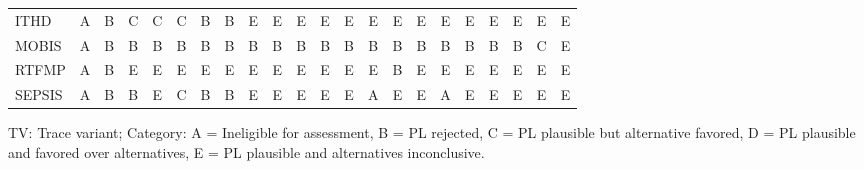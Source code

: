 {\begin{tabular}{lccccccccccccccccccccc}
ITHD & \cellcolor[HTML]{FFFFFF} A & \cellcolor[HTML]{EA4646} B & \cellcolor[HTML]{9670BD} C & \cellcolor[HTML]{9670BD} C & \cellcolor[HTML]{9670BD} C & \cellcolor[HTML]{EA4646} B & \cellcolor[HTML]{EA4646} B & \cellcolor[HTML]{19C8C8} E & \cellcolor[HTML]{19C8C8} E & \cellcolor[HTML]{19C8C8} E & \cellcolor[HTML]{19C8C8} E & \cellcolor[HTML]{19C8C8} E & \cellcolor[HTML]{19C8C8} E & \cellcolor[HTML]{19C8C8} E & \cellcolor[HTML]{19C8C8} E & \cellcolor[HTML]{19C8C8} E & \cellcolor[HTML]{19C8C8} E & \cellcolor[HTML]{19C8C8} E & \cellcolor[HTML]{19C8C8} E & \cellcolor[HTML]{19C8C8} E & \cellcolor[HTML]{19C8C8} E \\
MOBIS & \cellcolor[HTML]{FFFFFF} A & \cellcolor[HTML]{EA4646} B & \cellcolor[HTML]{EA4646} B & \cellcolor[HTML]{EA4646} B & \cellcolor[HTML]{EA4646} B & \cellcolor[HTML]{EA4646} B & \cellcolor[HTML]{EA4646} B & \cellcolor[HTML]{EA4646} B & \cellcolor[HTML]{EA4646} B & \cellcolor[HTML]{EA4646} B & \cellcolor[HTML]{EA4646} B & \cellcolor[HTML]{EA4646} B & \cellcolor[HTML]{EA4646} B & \cellcolor[HTML]{EA4646} B & \cellcolor[HTML]{EA4646} B & \cellcolor[HTML]{EA4646} B & \cellcolor[HTML]{EA4646} B & \cellcolor[HTML]{EA4646} B & \cellcolor[HTML]{EA4646} B & \cellcolor[HTML]{9670BD} C & \cellcolor[HTML]{19C8C8} E \\
RTFMP & \cellcolor[HTML]{FFFFFF} A & \cellcolor[HTML]{EA4646} B & \cellcolor[HTML]{19C8C8} E & \cellcolor[HTML]{19C8C8} E & \cellcolor[HTML]{19C8C8} E & \cellcolor[HTML]{19C8C8} E & \cellcolor[HTML]{19C8C8} E & \cellcolor[HTML]{19C8C8} E & \cellcolor[HTML]{19C8C8} E & \cellcolor[HTML]{19C8C8} E & \cellcolor[HTML]{19C8C8} E & \cellcolor[HTML]{19C8C8} E & \cellcolor[HTML]{19C8C8} E & \cellcolor[HTML]{EA4646} B & \cellcolor[HTML]{19C8C8} E & \cellcolor[HTML]{19C8C8} E & \cellcolor[HTML]{19C8C8} E & \cellcolor[HTML]{19C8C8} E & \cellcolor[HTML]{19C8C8} E & \cellcolor[HTML]{19C8C8} E & \cellcolor[HTML]{19C8C8} E \\
SEPSIS & \cellcolor[HTML]{FFFFFF} A & \cellcolor[HTML]{EA4646} B & \cellcolor[HTML]{EA4646} B & \cellcolor[HTML]{19C8C8} E & \cellcolor[HTML]{9670BD} C & \cellcolor[HTML]{EA4646} B & \cellcolor[HTML]{EA4646} B & \cellcolor[HTML]{19C8C8} E & \cellcolor[HTML]{19C8C8} E & \cellcolor[HTML]{19C8C8} E & \cellcolor[HTML]{19C8C8} E & \cellcolor[HTML]{19C8C8} E & \cellcolor[HTML]{FFFFFF} A & \cellcolor[HTML]{19C8C8} E & \cellcolor[HTML]{19C8C8} E & \cellcolor[HTML]{FFFFFF} A & \cellcolor[HTML]{19C8C8} E & \cellcolor[HTML]{19C8C8} E & \cellcolor[HTML]{19C8C8} E & \cellcolor[HTML]{19C8C8} E & \cellcolor[HTML]{19C8C8} E \\
\bottomrule
\end{tabular}
}
\begin{center}\footnotesize
TV: Trace variant; \quad Category: A = Ineligible for assessment, B = PL rejected, C = PL plausible but alternative favored, D = PL plausible and favored over alternatives, E = PL plausible and alternatives inconclusive.
\end{center}
